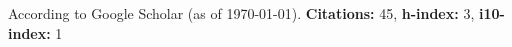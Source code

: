 \newif\ifshowpubsummary
\showpubsummarytrue %

\newif\ifshowsubmittedpubs

\newif\ifshowacceptedpubs

\nocite{*}
\ifshowpubsummary
    According to Google Scholar (as of \today). \hfill \textbf{Citations:} 45, \textbf{h-index:} 3, \textbf{i10-index:} 1

\else %
\fi

\ifshowsubmittedpubs
    \subsectiontitle{Submitted Publications}
    \printbibliography[keyword=submitted, heading=none]
\else %
\fi

\ifshowacceptedpubs
    \subsectiontitle{Accepted Publications}
    \printbibliography[keyword=accepted, heading=none]
\else %
\fi

\printbibliography[keyword=refereed, heading=none]
